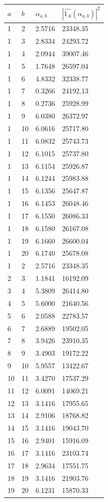 \documentclass{article}
\theoremstyle{definition}
\theoremstyle{remark}
\numberwithin{equation}{section}
\begin{document}
\begin{tabular}{|llll|}
\hline
$a$ & $b$ & $\alpha_{a,b}$ & $|\widehat{1_A}(\alpha_{a,b})|^2$\\
\hline
1 & 2 &  2.5716 & 23348.35\\
1 & 3 &  2.8334 & 24293.72\\
1 & 4 &  2.0944 & 39007.46\\
1 & 5 &  1.7648 & 26597.04\\
1 & 6 &  4.8332 & 32338.77\\
1 & 7 &  0.3266 & 24192.13\\
1 & 8 &  0.2736 & 25928.99\\
1 & 9 &  6.0380 & 26372.97\\
1 & 10 & 6.0616 & 25717.80\\
1 & 11 & 6.0832 & 25743.73\\
1 & 12 & 6.1015 & 25737.80\\
1 & 13 & 6.1154 & 25926.87\\
1 & 14 & 6.1244 & 25983.88\\
1 & 15 & 6.1356 & 25647.87\\
1 & 16 & 6.1453 & 26048.46\\
1 & 17 & 6.1550 & 26086.33\\
1 & 18 & 6.1580 & 26167.08\\
1 & 19 & 6.1660 & 26600.04\\
1 & 20 & 6.1740 & 25678.08\\
1 & 2 &  2.5716 & 23348.35\\
2 & 3 &  1.1841 & 16192.09\\
3 & 4 &  5.3809 & 26414.80\\
4 & 5 &  5.6000 & 21640.56\\
5 & 6 &  2.0588 & 22783.57\\
6 & 7 &  2.6889 & 19502.05\\
7 & 8 &  3.9426 & 23910.35\\
8 & 9 &  3.4903 & 19172.22\\
9 & 10 &  5.9557 & 13422.67\\
10 & 11 & 3.4270 & 17537.29\\
11 & 12 & 6.0091 & 14069.21\\
12 & 13 & 3.1416 & 17955.65\\
13 & 14 & 2.9106 & 18768.82\\
14 & 15 & 3.1416 & 19043.70\\
15 & 16 & 2.9401 & 15916.09\\
16 & 17 & 3.1416 & 23103.74\\
17 & 18 & 2.9634 & 17551.75\\
18 & 19 & 3.1416 & 21903.76\\
19 & 20 & 6.1231 & 15870.33\\
\hline
\end{tabular}
\end{document}
